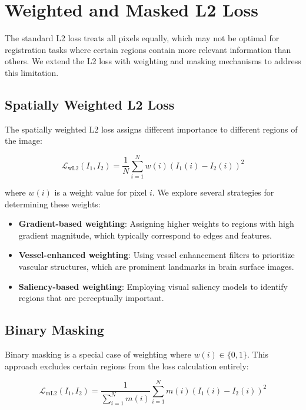 \section{Weighted and Masked L2 Loss}

The standard L2 loss treats all pixels equally, which may not be optimal for registration tasks where certain regions contain more relevant information than others. We extend the L2 loss with weighting and masking mechanisms to address this limitation.

\subsection{Spatially Weighted L2 Loss}

The spatially weighted L2 loss assigns different importance to different regions of the image:

\begin{equation}
    \mathcal{L}_{\text{wL2}}(I_1, I_2) = \frac{1}{N} \sum_{i=1}^{N} w(i) (I_1(i) - I_2(i))^2
\end{equation}

where $w(i)$ is a weight value for pixel $i$. We explore several strategies for determining these weights:

\begin{itemize}
    \item \textbf{Gradient-based weighting}: Assigning higher weights to regions with high gradient magnitude, which typically correspond to edges and features.
    
    \item \textbf{Vessel-enhanced weighting}: Using vessel enhancement filters to prioritize vascular structures, which are prominent landmarks in brain surface images.
    
    \item \textbf{Saliency-based weighting}: Employing visual saliency models to identify regions that are perceptually important.
\end{itemize}

\subsection{Binary Masking}

Binary masking is a special case of weighting where $w(i) \in \{0, 1\}$. This approach excludes certain regions from the loss calculation entirely:

\begin{equation}
    \mathcal{L}_{\text{mL2}}(I_1, I_2) = \frac{1}{\sum_{i=1}^{N} m(i)} \sum_{i=1}^{N} m(i) (I_1(i) - I_2(i))^2
\end{equation}

